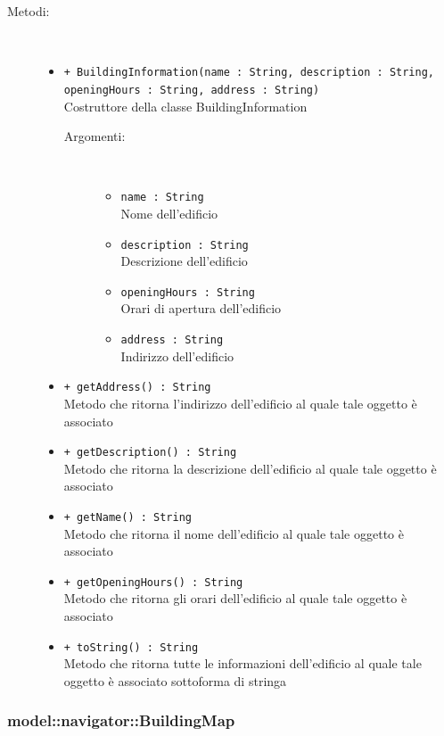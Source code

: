 \documentclass[../DefinizioneDiProdotto.tex]{subfiles}
\begin{document}
\begin{description}
\begin{itemize}
\end{itemize}
\item[Metodi:] \
\begin{itemize}
\item \texttt{+ BuildingInformation(name : String, description : String, openingHours : String, address : String)}\\
Costruttore della classe BuildingInformation
 \begin{description}
\item[Argomenti:] \
\begin{itemize}
\item \texttt{name : String}\\
Nome dell'edificio\item \texttt{description : String}\\
Descrizione dell'edificio\item \texttt{openingHours : String}\\
Orari di apertura dell'edificio\item \texttt{address : String}\\
Indirizzo dell'edificio\end{itemize}
\end{description}
\item \texttt{+ getAddress() : String}\\
Metodo che ritorna l'indirizzo dell'edificio al quale tale oggetto è associato
 \item \texttt{+ getDescription() : String}\\
Metodo che ritorna la descrizione dell'edificio al quale tale oggetto è associato
 \item \texttt{+ getName() : String}\\
Metodo che ritorna il nome dell'edificio al quale tale oggetto è associato
 \item \texttt{+ getOpeningHours() : String}\\
Metodo che ritorna gli orari dell'edificio al quale tale oggetto è associato
 \item \texttt{+ toString() : String}\\
Metodo che ritorna tutte le informazioni dell'edificio al quale tale oggetto è associato sottoforma di stringa
 \end{itemize}
\end{description}

\subsubsection{model::navigator::BuildingMap}
\end{document}
